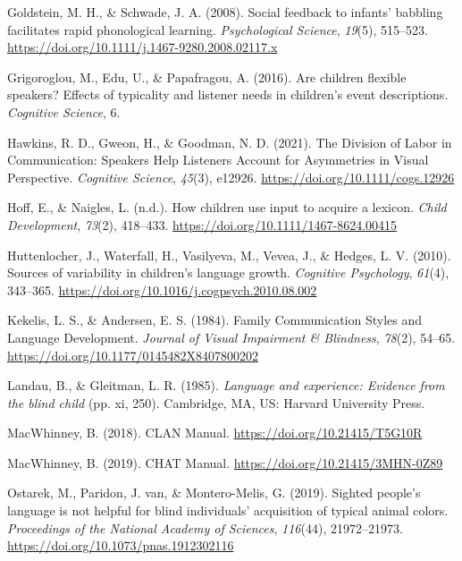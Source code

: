 \documentclass[english,man]{apa6}
\begin{document}
\leavevmode\hypertarget{ref-goldstein2008}{}%
Goldstein, M. H., \& Schwade, J. A. (2008). Social feedback to infants' babbling facilitates rapid phonological learning. \emph{Psychological Science}, \emph{19}(5), 515--523. \url{https://doi.org/10.1111/j.1467-9280.2008.02117.x}

\leavevmode\hypertarget{ref-grigoroglou2016}{}%
Grigoroglou, M., Edu, U., \& Papafragou, A. (2016). Are children flexible speakers? Effects of typicality and listener needs in children's event descriptions. \emph{Cognitive Science}, 6.

\leavevmode\hypertarget{ref-hawkins2021}{}%
Hawkins, R. D., Gweon, H., \& Goodman, N. D. (2021). The Division of Labor in Communication: Speakers Help Listeners Account for Asymmetries in Visual Perspective. \emph{Cognitive Science}, \emph{45}(3), e12926. \url{https://doi.org/10.1111/cogs.12926}

\leavevmode\hypertarget{ref-hoff2002}{}%
Hoff, E., \& Naigles, L. (n.d.). How children use input to acquire a lexicon. \emph{Child Development}, \emph{73}(2), 418--433. \url{https://doi.org/10.1111/1467-8624.00415}

\leavevmode\hypertarget{ref-huttenlocher2010}{}%
Huttenlocher, J., Waterfall, H., Vasilyeva, M., Vevea, J., \& Hedges, L. V. (2010). Sources of variability in children's language growth. \emph{Cognitive Psychology}, \emph{61}(4), 343--365. \url{https://doi.org/10.1016/j.cogpsych.2010.08.002}

\leavevmode\hypertarget{ref-kekelis1984}{}%
Kekelis, L. S., \& Andersen, E. S. (1984). Family Communication Styles and Language Development. \emph{Journal of Visual Impairment \& Blindness}, \emph{78}(2), 54--65. \url{https://doi.org/10.1177/0145482X8407800202}

\leavevmode\hypertarget{ref-landau1985}{}%
Landau, B., \& Gleitman, L. R. (1985). \emph{Language and experience: Evidence from the blind child} (pp. xi, 250). Cambridge, MA, US: Harvard University Press.

\leavevmode\hypertarget{ref-macwhinney2018}{}%
MacWhinney, B. (2018). CLAN Manual. \url{https://doi.org/10.21415/T5G10R}

\leavevmode\hypertarget{ref-macwhinney2019}{}%
MacWhinney, B. (2019). CHAT Manual. \url{https://doi.org/10.21415/3MHN-0Z89}

\leavevmode\hypertarget{ref-ostarek2019}{}%
Ostarek, M., Paridon, J. van, \& Montero-Melis, G. (2019). Sighted people's language is not helpful for blind individuals' acquisition of typical animal colors. \emph{Proceedings of the National Academy of Sciences}, \emph{116}(44), 21972--21973. \url{https://doi.org/10.1073/pnas.1912302116}
\end{document}
